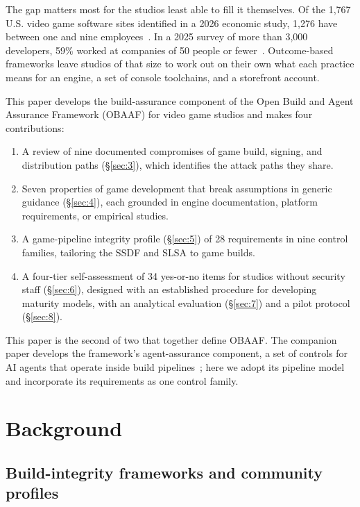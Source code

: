 \documentclass[acmsmall,screen,review]{acmart}
\begin{document}
The gap matters most for the studios least able to fill it themselves. Of the 1,767 U.S. video game software sites identified in a 2026 economic study, 1,276 have between one and nine employees~\cite{grueber2026video}. In a 2025 survey of more than 3,000 developers, 59\% worked at companies of 50 people or fewer~\cite{game2025state}. Outcome-based frameworks leave studios of that size to work out on their own what each practice means for an engine, a set of console toolchains, and a storefront account.

This paper develops the build-assurance component of the Open Build and Agent Assurance Framework (OBAAF) for video game studios and makes four contributions:

\begin{enumerate}
\item A review of nine documented compromises of game build, signing, and distribution paths (\S\ref{sec:3}), which identifies the attack paths they share.
\item Seven properties of game development that break assumptions in generic guidance (\S\ref{sec:4}), each grounded in engine documentation, platform requirements, or empirical studies.
\item A game-pipeline integrity profile (\S\ref{sec:5}) of 28 requirements in nine control families, tailoring the SSDF and SLSA to game builds.
\item A four-tier self-assessment of 34 yes-or-no items for studios without security staff (\S\ref{sec:6}), designed with an established procedure for developing maturity models, with an analytical evaluation (\S\ref{sec:7}) and a pilot protocol (\S\ref{sec:8}).
\end{enumerate}

This paper is the second of two that together define OBAAF. The companion paper develops the framework's agent-assurance component, a set of controls for AI agents that operate inside build pipelines~\cite{keluoudeke2026untrusted}; here we adopt its pipeline model and incorporate its requirements as one control family.


\section{Background}\label{sec:2}


\subsection{Build-integrity frameworks and community profiles}\label{sec:2.1}
\end{document}
